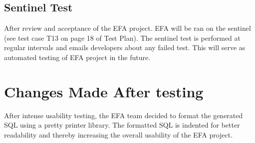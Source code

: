 \documentclass[12pt, svgnames]{article}
\begin{document}
\subsection{Sentinel Test}
After review and acceptance of the EFA project. EFA will be ran on the sentinel (see test case T13 on page 18 of Test Plan). The sentinel test is performed at regular intervals and emails developers about any failed test. This will serve as automated testing of EFA project in the future.

\section{Changes Made After testing}
After intense usability testing, the EFA team decided to format the generated SQL using a pretty printer library. The formatted SQL is indented for better readability and thereby increasing the overall usability of the EFA project.


\printglossaries


\end{document}

